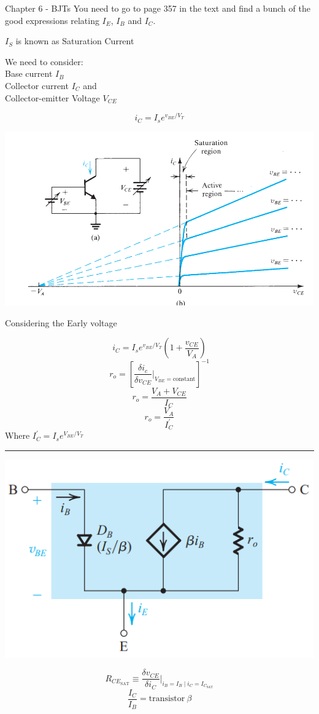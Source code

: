 \documentclass[a4paper]{article}
\newcommand{\hrl}{
    \vspace{2mm}
    \hrule
    \vspace{2mm}
}
\begin{document}
\begin{multicols}{3}
\setlength{\abovedisplayskip}{2pt}
\setlength{\belowdisplayskip}{0pt}
Chapter 6 - BJTs
You need to go to page 357 in the text and find a bunch of the good
expressions relating $I_E$, $I_B$ and $I_C$.

$I_S$ is known as Saturation Current

We need to consider:\\
Base current $I_B$\\
Collector current $I_C$ and \\
Collector-emitter Voltage $V_{CE}$

$$i_C=I_s e^{v_{BE}/V_T}$$

\includegraphics[width=\linewidth]{imgs/slopes.png}

Considering the Early voltage

$$i_C=I_s e^{v_{BE}/V_T} \left(1 + \frac{v_{CE}}{V_A}\right)$$
$$r_o=\left[\frac{\delta i_c}{\delta v_{CE}}\Big|_{V_{BE} = \text{constant}}\right]^{-1}$$
$$r_o=\frac{V_A + V_{CE}}{I_C}$$
$$r_o=\frac{V_A}{I_C^{'}}$$
Where $I_C^{'}=I_s e^{V_{BE}/V_T}$

\hrl
\includegraphics[width=\linewidth]{imgs/bjt_model.png}

$$ R_{CE_\text{SAT}} \equiv \frac{\delta v_{CE}}{\delta i_C} \Big|_{i_B = I_B \mid i_C=I_{C_\text{SAT}}}$$
$$ \frac{I_C}{I_B} = \text{transistor}~\beta $$



\end{multicols}
\end{document}
